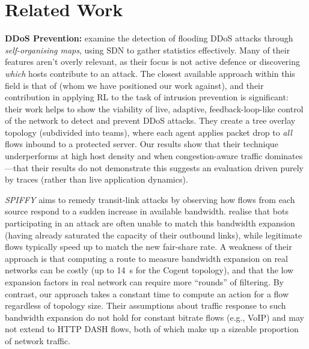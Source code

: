 \documentclass[10pt, times, comsoc]{IEEEtran}
\newcommand{\fakepara}[1]{\noindent\textbf{#1:}}
\begin{document}
\section{Related Work}\label{sec:related-work}


\fakepara{DDoS Prevention}
\Textcite{DBLP:conf/lcn/BragaMP10} examine the detection of flooding DDoS attacks through \emph{self-organising maps}, using SDN to gather statistics effectively.
Many of their features aren't overly relevant, as their focus is not active defence or discovering \emph{which} hosts contribute to an attack.
The closest available approach within this field is that of \textcite{DBLP:journals/eaai/MalialisK15} (whom we have positioned our work against), and their contribution in applying RL to the task of intrusion prevention is significant: their work helps to show the viability of live, adaptive, feedback-loop-like control of the network to detect and prevent DDoS attacks.
They create a tree overlay topology (subdivided into teams), where each agent applies packet drop to \emph{all} flows inbound to a protected server.
Our results show that their technique underperforms at high host density and when congestion-aware traffic dominates---that their results do not demonstrate this suggests an evaluation driven purely by traces (rather than live application dynamics).

\emph{SPIFFY} \cite{DBLP:conf/ndss/KangGS16} aims to remedy transit-link attacks by observing how flows from each source respond to a sudden increase in available bandwidth.
 realise that bots participating in an attack are often unable to match this bandwidth expansion (having already saturated the capacity of their outbound links), while legitimate flows typically speed up to match the new fair-share rate.
A weakness of their approach is that computing a route to measure bandwidth expansion on real networks can be costly (up to \SI{14}{\second} for the Cogent topology), and that the low expansion factors in real network can require more ``rounds'' of filtering.
\cbstart
{\color{revisiontext}By contrast, our approach takes a constant time to compute an action for a flow regardless of topology size.
Their assumptions about traffic response to such bandwidth expansion do not hold for constant bitrate flows (e.g., VoIP) and may not extend to HTTP DASH flows, both of which make up a sizeable proportion of network \cbend traffic.}
\end{document}
